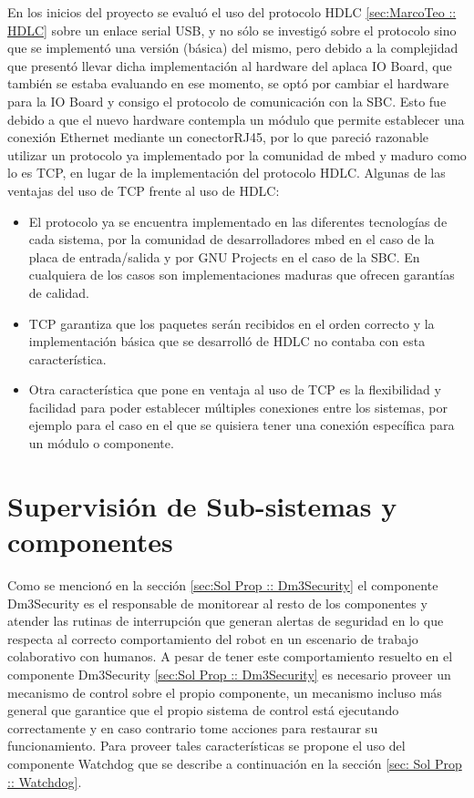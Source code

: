 \documentclass[withindex,glossary]{cam-thesis}
\begin{document}
En los inicios del proyecto se evaluó el uso del protocolo HDLC \ref{sec:MarcoTeo :: HDLC} sobre un enlace serial \gls{USB}, y no sólo se investigó sobre el protocolo sino que se implementó una versión (básica) del mismo, pero debido a la complejidad que presentó llevar dicha implementación al hardware del aplaca IO Board, que también se estaba evaluando en ese momento, se optó por cambiar el hardware para la IO Board y consigo el protocolo de comunicación con la \gls{SBC}. Esto fue debido a que el nuevo hardware contempla un módulo que permite establecer una conexión \gls{Ethernet} mediante un \gls{conectorRJ45}, por lo que pareció razonable utilizar un protocolo ya implementado por la comunidad de mbed y maduro como lo es TCP, en lugar de la implementación del protocolo HDLC.
Algunas de las ventajas del uso de TCP frente al uso de HDLC:
\begin{itemize}
\item El protocolo ya se encuentra implementado en las diferentes tecnologías de cada sistema, por la comunidad de desarrolladores mbed \cite{ARMMBEDCODE} en el caso de la placa de entrada/salida y por GNU Projects \cite{GNUPROJECTS} en el caso de la \gls{SBC}. En cualquiera de los casos son implementaciones maduras que ofrecen garantías de calidad.
\item TCP garantiza que los paquetes serán recibidos en el orden correcto y la implementación básica que se desarrolló de HDLC no contaba con esta característica.
\item Otra característica que pone en ventaja al uso de TCP es la flexibilidad y facilidad para poder establecer múltiples conexiones entre los sistemas, por ejemplo para el caso en el que se quisiera tener una conexión específica para un módulo o componente.
\end{itemize}

\section{Supervisión de Sub-sistemas y componentes}
Como se mencionó en la sección \ref{sec:Sol Prop :: Dm3Security} el componente Dm3Security es el responsable de monitorear al resto de los componentes  y atender las rutinas de interrupción que generan alertas de seguridad en lo que respecta al correcto comportamiento del robot en un escenario de trabajo colaborativo con humanos. A pesar de tener este comportamiento resuelto en el componente Dm3Security \ref{sec:Sol Prop :: Dm3Security} es necesario proveer un mecanismo de control sobre el propio componente, un mecanismo incluso más general que garantice que el propio sistema de control está ejecutando correctamente y en caso contrario tome acciones para restaurar su funcionamiento.
Para proveer tales características se propone el uso del componente Watchdog que se describe a continuación en la sección  \ref{sec: Sol Prop :: Watchdog}.
\end{document}
